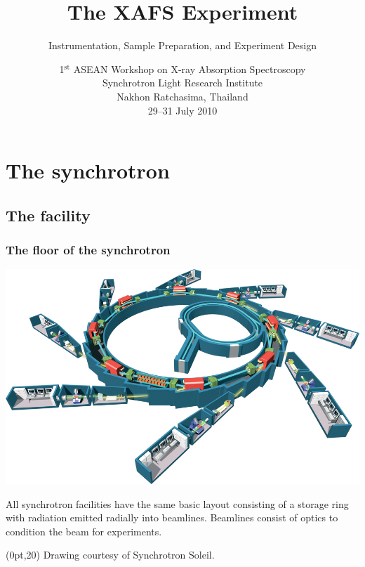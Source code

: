 \documentclass[10pt, xcolor=x11names, compress]{beamer}
\title{The XAFS Experiment}
\subtitle[]{Instrumentation, Sample Preparation, and Experiment
  Design}
\date[1$^{\mathrm{st}}$ ASEAN XAS]{1$^{\mathrm{st}}$ ASEAN Workshop on
  X-ray Absorption Spectroscopy\\Synchrotron Light Research
  Institute\\Nakhon Ratchasima, Thailand \\29--31 July 2010}
\begin{document}
\begin{frame}
  \titlepage
\end{frame}





\section{The synchrotron}
\label{sec:synch}

\subsection{The facility}

\begin{frame}
  \frametitle{The floor of the synchrotron}
  
  \begin{center}
    \includegraphics[width=0.8\linewidth]{synch/SOL008h.jpg}
    
    \smallskip

    All synchrotron facilities have the same basic layout consisting
    of a storage ring with radiation emitted radially into beamlines.
    Beamlines consist of optics to condition the beam for experiments.
  \end{center}
  \begin{textblock*}{0.5\linewidth}(0pt,20\TPVertModule)%
    \tiny%
    Drawing courtesy of Synchrotron Soleil.
  \end{textblock*}
\end{frame}
\end{document}
